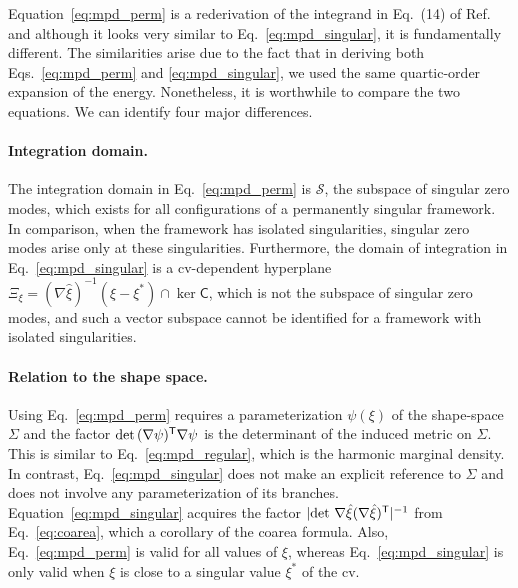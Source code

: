 Equation~\eqref{eq:mpd_perm} is a rederivation of the integrand in Eq.~(14) of Ref.~\cite{kallus2017} and although it looks very similar to Eq.~\eqref{eq:mpd_singular}, it is fundamentally different.
The similarities arise due to the fact that in deriving both Eqs.~\eqref{eq:mpd_perm} and \eqref{eq:mpd_singular}, we used the same quartic-order expansion of the energy.
Nonetheless, it is worthwhile to compare the two equations.
We can identify four major differences.

\paragraph{Integration domain.}
The integration domain in Eq.~\eqref{eq:mpd_perm} is $\mathscr{S}$, the subspace of singular zero modes, which exists for all configurations of a permanently singular framework.
In comparison, when the framework has isolated singularities, singular zero modes arise only at these singularities.
Furthermore, the domain of integration in Eq.~\eqref{eq:mpd_singular} is a \ac{cv}-dependent hyperplane $\Xi_{\xi} = (\nabla\hat{\xi})^{-1}(\xi - \xi^{*}) \cap \ker\mathsf{C}$, which is not the subspace of singular zero modes, and such a vector subspace cannot be identified for a framework with isolated singularities.

\paragraph{Relation to the shape space.}
Using Eq.~\eqref{eq:mpd_perm} requires a parameterization $\psi(\xi)$ of the shape-space $\Sigma$ and the factor $\det\,(\nabla\psi)^\mathsf{T}\nabla\psi$ is the determinant of the induced metric on $\Sigma$.
This is similar to Eq.~\eqref{eq:mpd_regular}, which is the harmonic marginal density.
In contrast, Eq.~\eqref{eq:mpd_singular} does not make an explicit reference to $\Sigma$ and does not involve any parameterization of its branches.
Equation~\eqref{eq:mpd_singular} acquires the factor $\lvert\det\,{\nabla\hat{\xi}}(\nabla\hat{\xi})^\mathsf{T}\rvert^{-1}$ from Eq.~\eqref{eq:coarea}, which a corollary of the coarea formula.
Also, Eq.~\eqref{eq:mpd_perm} is valid for all values of $\xi$, whereas Eq.~\eqref{eq:mpd_singular} is only valid when $\xi$ is close to a singular value $\xi^{*}$ of the \ac{cv}.

